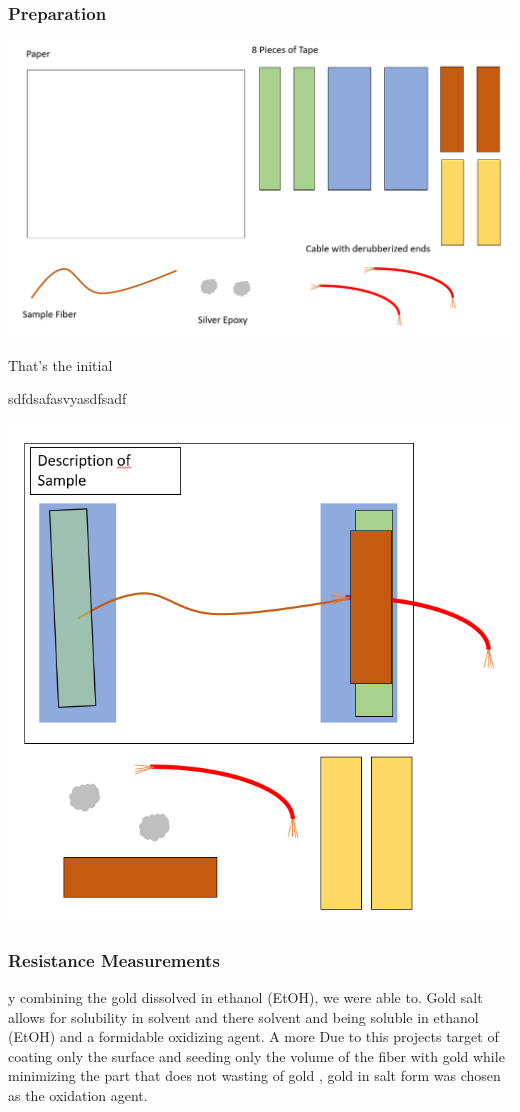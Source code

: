 \subsubsection{Preparation}
\centerline{\includegraphics[scale=0.6]{Meas_Prep_1.PNG}}
\caption{That's the initial}
sdfdsafasvyasdfsadf \newline

\centerline{\includegraphics[scale=0.6]{Meas_Prep_2.PNG}}
\subsubsection{Resistance Measurements}

y combining the gold dissolved in ethanol (EtOH), we were able to. Gold salt allows for solubility in solvent and there solvent and  being soluble in ethanol (EtOH) and a formidable oxidizing agent. A more 
Due to this projects target of coating only the surface and seeding only the volume of the fiber with gold while minimizing the part that does not wasting of gold , gold in salt form was chosen as the oxidation agent.